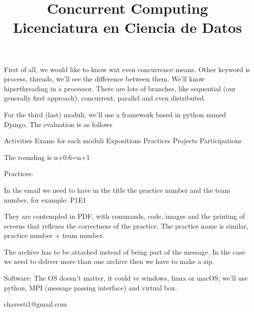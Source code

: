 \documentclass[12pt,a4paper]{article}
\title{\textbf{Concurrent Computing}\\
\large Licenciatura en Ciencia de Datos}
\author{}
\date{}
\begin{document}
\maketitle

First of all, we would like to know wat even concurrence means. Other keyword is process, threads, we'll see the difference between them. We'll know hiperthreading in a processor.
There are lots of branches, like sequential (our generally first approach), concurrent, parallel and even distributed.

For the third (last) moduli, we'll use a framework based in python named Django.
The evaluation is as follows

Activities
Exams for each moduli
Expositions
Practices
Projects
Participations

The rounding is n+0.6=n+1

Practices:

In the email we need to have in the title the practice number and the team number, for example: P1E1

They are contempled in PDF, with commands, code, images and the printing of screens that reflexes the correctness of the practice.
The practice name is similar, practice number + team number.

The archive has to be attached instead of being part of the message. In the case we need to deliver more than one archive then we have to make a zip.

Software:
The OS doesn't matter, it could ve windows, linux or macOS; we'll use python, MPI (message passing interface) and virtual box.

chavesti1@gmail.com
\end{document}
